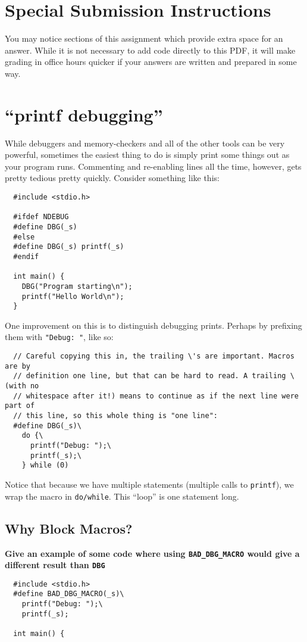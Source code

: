 \documentclass{article}
\begin{document}


\section*{Special Submission Instructions}
You may notice sections of this assignment which provide extra space for an
answer. While it is not necessary to add code directly to this PDF, it will
make grading in office hours quicker if your answers are written and prepared
in some way.

\newpage


\section{``printf debugging''}

While debuggers and memory-checkers and all of the other tools can be very
powerful, sometimes the easiest thing to do is simply print some things out as
your program runs. Commenting and re-enabling lines all the time, however,
gets pretty tedious pretty quickly. Consider something like this:

\begin{lstlisting}
  #include <stdio.h>

  #ifdef NDEBUG
  #define DBG(_s)
  #else
  #define DBG(_s) printf(_s)
  #endif

  int main() {
    DBG("Program starting\n");
    printf("Hello World\n");
  }
\end{lstlisting}

One improvement on this is to distinguish debugging prints. Perhaps by
prefixing them with \texttt{"Debug: "}, like so:

\begin{lstlisting}
  // Careful copying this in, the trailing \'s are important. Macros are by
  // definition one line, but that can be hard to read. A trailing \ (with no
  // whitespace after it!) means to continue as if the next line were part of
  // this line, so this whole thing is "one line":
  #define DBG(_s)\
    do {\
      printf("Debug: ");\
      printf(_s);\
    } while (0)
\end{lstlisting}

Notice that because we have multiple statements (multiple calls to
\texttt{printf}), we wrap the macro in \texttt{do/while}. This ``loop'' is
one statement long.

\subsection{Why Block Macros?}
\textbf{Give an example of some code where using \texttt{BAD\_DBG\_MACRO}
  would give a different result than \texttt{DBG}}
\begin{lstlisting}
  #include <stdio.h>
  #define BAD_DBG_MACRO(_s)\
    printf("Debug: ");\
    printf(_s);

  int main() {
\end{lstlisting}
\end{document}
